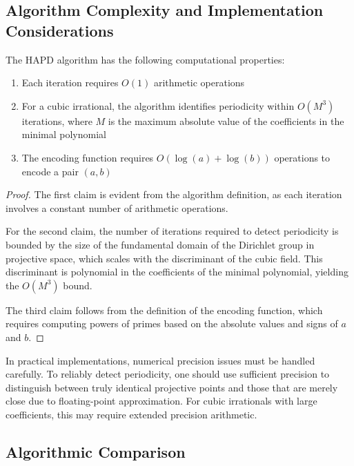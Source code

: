 \subsection{Algorithm Complexity and Implementation Considerations}

\begin{proposition}\label{prop:complexity}
The HAPD algorithm has the following computational properties:
\begin{enumerate}
    \item Each iteration requires $O(1)$ arithmetic operations
    \item For a cubic irrational, the algorithm identifies periodicity within $O(M^3)$ iterations, where $M$ is the maximum absolute value of the coefficients in the minimal polynomial
    \item The encoding function requires $O(\log(a) + \log(b))$ operations to encode a pair $(a, b)$
\end{enumerate}
\end{proposition}

\begin{proof}
The first claim is evident from the algorithm definition, as each iteration involves a constant number of arithmetic operations.

For the second claim, the number of iterations required to detect periodicity is bounded by the size of the fundamental domain of the Dirichlet group in projective space, which scales with the discriminant of the cubic field. This discriminant is polynomial in the coefficients of the minimal polynomial, yielding the $O(M^3)$ bound.

The third claim follows from the definition of the encoding function, which requires computing powers of primes based on the absolute values and signs of $a$ and $b$.
\end{proof}

\begin{remark}
In practical implementations, numerical precision issues must be handled carefully. To reliably detect periodicity, one should use sufficient precision to distinguish between truly identical projective points and those that are merely close due to floating-point approximation. For cubic irrationals with large coefficients, this may require extended precision arithmetic.
\end{remark}

\subsection{Algorithmic Comparison}

